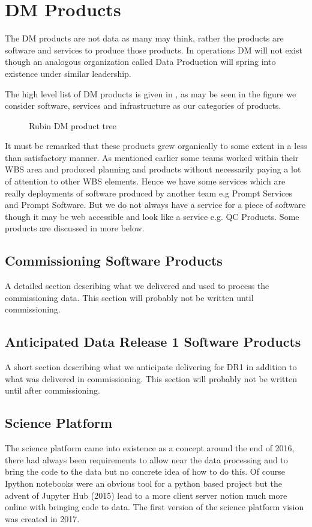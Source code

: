 \section {DM Products} \label{sec:softproducts}
The DM products are not data as many may think, rather the products are software and services to produce those
products.
In operations DM will not exist though an analogous organization called Data Production will spring into existence under similar leadership.

The high level list of DM products is given in , as may be seen in the  figure we consider software, services and infrastructure as our categories of products.


\begin{figure}
\caption{Rubin DM product tree \label{fig:pt}}
\end{figure}

It must be remarked that these products grew organically to some extent in a less than satisfactory manner.
As mentioned earlier some teams worked within their WBS area and produced planning and products without necessarily paying a lot of attention to other WBS elements. Hence we have some services which are really deployments of software produced by another team e.g Prompt Services and Prompt Software. But we do not always have a service for a piece of software though it may be web accessible and look like a service e.g. QC Products.
Some products are discussed in more below.


\subsection{Commissioning Software Products}
A detailed section describing what we delivered and used to process the commissioning data.
This section will probably not be written until  commissioning.

\subsection{Anticipated Data Release 1 Software Products}
A short section describing what we anticipate delivering  for DR1 in addition to what was delivered in commissioning.
This section will probably not be written until after commissioning.

\subsection{Science Platform}\label{sec:sciplat}
The science platform came into existence as a concept around the end of 2016, there had always been requirements to allow near the data processing and to  bring the code to the data but no concrete idea of how to do this. Of course Ipython notebooks were an obvious tool for a python based project but the advent of  Jupyter Hub  (2015) lead to a more client server notion much more online with bringing code to data. The first version of the science platform vision \citep{LSE-319} was created in 2017.

